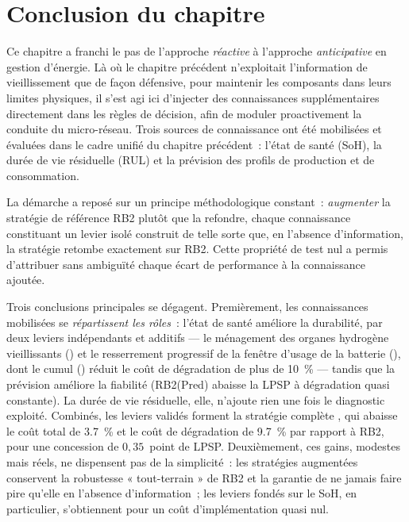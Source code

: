 
\section{Conclusion du chapitre}
\label{sec:conclusion_ch4}

Ce chapitre a franchi le pas de l'approche \emph{réactive} à l'approche \emph{anticipative} en gestion d'énergie. Là où le chapitre précédent n'exploitait l'information de vieillissement que de façon défensive, pour maintenir les composants dans leurs limites physiques, il s'est agi ici d'injecter des connaissances supplémentaires directement dans les règles de décision, afin de moduler proactivement la conduite du micro-réseau. Trois sources de connaissance ont été mobilisées et évaluées dans le cadre unifié du chapitre précédent~: l'état de santé (SoH), la durée de vie résiduelle (RUL) et la prévision des profils de production et de consommation.

La démarche a reposé sur un principe méthodologique constant~: \emph{augmenter} la stratégie de référence RB2 plutôt que la refondre, chaque connaissance constituant un levier isolé construit de telle sorte que, en l'absence d'information, la stratégie retombe exactement sur RB2. Cette propriété de test nul a permis d'attribuer sans ambiguïté chaque écart de performance à la connaissance ajoutée.

Trois conclusions principales se dégagent. Premièrement, les connaissances mobilisées se \emph{répartissent les rôles}~: l'état de santé améliore la durabilité, par deux leviers indépendants et additifs --- le ménagement des organes hydrogène vieillissants (\RBsohH) et le resserrement progressif de la fenêtre d'usage de la batterie (\RBsohB), dont le cumul (\RBsohA) réduit le coût de dégradation de plus de \SI{10}{\percent} --- tandis que la prévision améliore la fiabilité (RB2(Pred) abaisse la LPSP à dégradation quasi constante). La durée de vie résiduelle, elle, n'ajoute rien une fois le diagnostic exploité. Combinés, les leviers validés forment la stratégie complète \RBult, qui abaisse le coût total de \SI{3.7}{\percent} et le coût de dégradation de \SI{9.7}{\percent} par rapport à RB2, pour une concession de $0{,}35$~point de LPSP. Deuxièmement, ces gains, modestes mais réels, ne dispensent pas de la simplicité~: les stratégies augmentées conservent la robustesse « tout-terrain » de RB2 et la garantie de ne jamais faire pire qu'elle en l'absence d'information~; les leviers fondés sur le SoH, en particulier, s'obtiennent pour un coût d'implémentation quasi nul.

